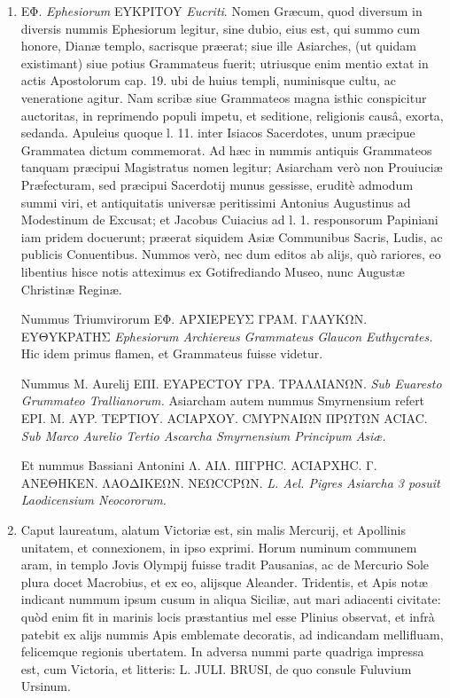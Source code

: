 \documentclass[a4paper, 11pt, oneside, polutonikogreek, latin]{article}
\begin{document}
\begin{enumerate}
    \item EΦ. \emph{Ephesiorum} EYKPITOY \emph{Eucriti}. Nomen Græcum, quod diversum in diversis nummis Ephesiorum legitur, sine dubio, eius est, qui summo cum honore, Dianæ templo, sacrisque præerat; siue ille Asiarches, (ut quidam existimant) siue potius Grammateus fuerit; utriusque enim mentio extat in actis Apostolorum cap. 19. ubi de huius templi, numinisque cultu, ac veneratione agitur. Nam scribæ siue Grammateos magna isthic conspicitur auctoritas, in reprimendo populi impetu, et seditione, religionis causâ, exorta, sedanda. Apuleius quoque l. 11. inter Isiacos Sacerdotes, unum præcipue Grammatea dictum commemorat. Ad hæc in nummis antiquis Grammateos tanquam præcipui Magistratus nomen legitur; Asiarcham verò non Prouiuciæ Præfecturam, sed præcipui Sacerdotij munus gessisse, eruditè admodum summi viri, et antiquitatis universæ peritissimi Antonius Augustinus ad Modestinum de Excusat; et Jacobus Cuiacius ad l. 1. responsorum Papiniani iam pridem docuerunt; præerat siquidem Asiæ Communibus Sacris, Ludis, ac publicis Conuentibus. Nummos verò, nec dum editos ab alijs, quò rariores, eo libentius hisce notis atteximus ex Gotifrediando Museo, nunc Augustæ Christinæ Reginæ.

    Nummus Triumvirorum EΦ. APXIEPEYΣ ΓPAM. ΓΛAYKΩN. EYΘYKPATHΣ \emph{Ephesiorum Archiereus Grammateus Glaucon Euthycrates.} Hic idem primus flamen, et Grammateus fuisse videtur.

    Nummus M. Aurelij EΠI. EYAPECTOY ΓPA. TPAΛΛIANΩN. \emph{Sub Euaresto Grummateo Trallianorum.} Asiarcham autem nummus Smyrnensium refert EPI. M. AYP. TEPTIOY. ACIAPXOY. CMYPNAIΩN ΠPΩTΩN ACIAC. \emph{Sub Marco Aurelio Tertio Ascarcha Smyrnensium Principum Asiæ.}

    Et nummus Bassiani Antonini Λ. AIΛ. ΠIΓPHC. ACIAPXHC. Γ. ANEΘHKEN. ΛAOΔIKEΩN. NEΩCCPΩN. \emph{L. Ael. Pigres Asiarcha 3 posuit Laodicensium Neocororum.}

    \item Caput laureatum, alatum Victoriæ est, sin malis Mercurij, et Apollinis unitatem, et connexionem, in ipso exprimi. Horum numinum communem aram, in templo Jovis Olympij fuisse tradit Pausanias, ac de Mercurio Sole plura docet Macrobius, et ex eo, alijsque Aleander. Tridentis, et Apis notæ indicant nummum ipsum cusum in aliqua Siciliæ, aut mari adiacenti civitate: quòd enim fit in marinis locis præstantius mel esse Plinius observat, et infrà patebit ex alijs nummis Apis emblemate decoratis, ad indicandam mellifluam, felicemque regionis ubertatem. In adversa nummi parte quadriga impressa est, cum Victoria, et litteris: L. JULI. BRUSI, de quo consule Fuluvium Ursinum.


\end{enumerate}
\end{document}
